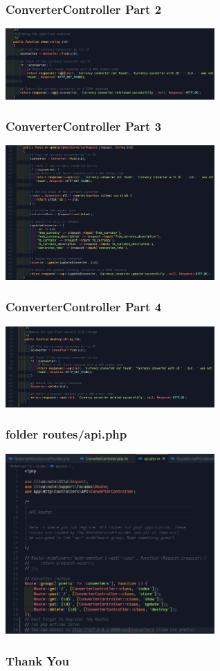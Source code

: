 \documentclass[aspectratio=169, table]{beamer}
\begin{document}
\begin{frame}[fragile]
 \frametitle{ConverterController Part 2}
 \vskip1cm
 \begin{center}
  \includegraphics[width=0.6\textwidth]{classFiles/pertemuan-10-controller-part-2.png}
 \end{center}
\end{frame}

\begin{frame}[fragile]
 \frametitle{ConverterController Part 3}
 \vskip1cm
 \begin{center}
  \includegraphics[width=0.6\textwidth]{classFiles/pertemuan-10-controller-part-3.png}
 \end{center}
\end{frame}

\begin{frame}[fragile]
 \frametitle{ConverterController Part 4}
 \vskip1cm
 \begin{center}
  \includegraphics[width=0.6\textwidth]{classFiles/pertemuan-10-controller-part-4.png}
 \end{center}
\end{frame}

\begin{frame}[fragile]
 \frametitle{folder routes/api.php}
 \vskip1cm
 \begin{center}
  \includegraphics[width=0.6\textwidth]{classFiles/pertemuan-10-routes-api.png}
 \end{center}
\end{frame}

\begin{frame4}
    \frametitle{Thank You}
\end{frame4}
\end{document}
